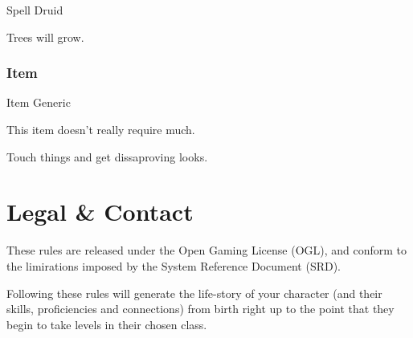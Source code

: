 \documentclass[10pt,twoside]{article}
\begin{document}
\begin{multicols}{2}
\begin{spellbox}{Spell Druid}
    \begin{spellaction}[Effect]
    Trees will grow.
    \end{spellaction}
\end{spellbox}

\subsubsection*{Item}

\begin{itembox}{Item Generic}
    \itemdetails[]
    \begin{itemaction}[Materials]
    This item doesn't really require much.
    \end{itemaction}

    \begin{itemaction}[Effect]
    Touch things and get dissaproving looks.
    \end{itemaction}
\end{itembox}

\section{Legal \& Contact}
These rules are released under the Open Gaming License (OGL), and conform to the limirations imposed by the System Reference Document (SRD).


Following these rules will generate the life-story of your character (and their skills, proficiencies and connections) from birth right up to the point that they begin to take levels in their chosen class.
\end{multicols}
\end{document}
